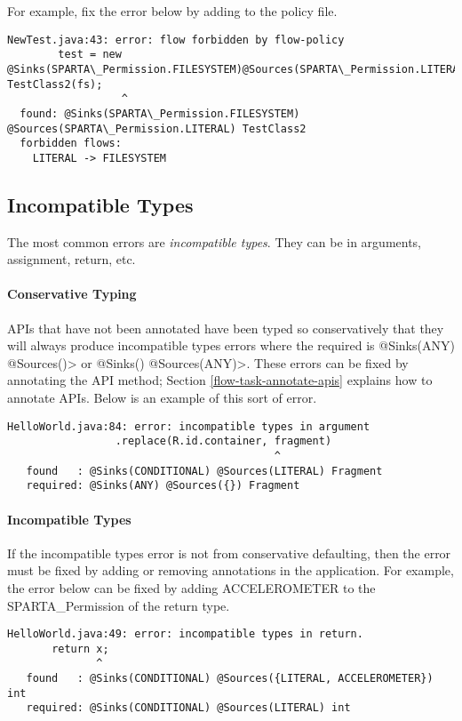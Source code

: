 For example, fix the error below by adding  to the policy file.
\begin{Verbatim}
NewTest.java:43: error: flow forbidden by flow-policy  
        test = new @Sinks(SPARTA\_Permission.FILESYSTEM)@Sources(SPARTA\_Permission.LITERAL) TestClass2(fs);
                  ^
  found: @Sinks(SPARTA\_Permission.FILESYSTEM) @Sources(SPARTA\_Permission.LITERAL) TestClass2 
  forbidden flows:
    LITERAL -> FILESYSTEM
\end{Verbatim}

\subsection{Incompatible Types}
The most common errors are \emph{incompatible types}.  They can be in arguments,  assignment, return, etc.

\paragraph{Conservative Typing}

APIs that have not been annotated have been typed so conservatively that they will always produce incompatible types errors where the required is \<@Sinks(ANY) @Sources({})> or 
\<@Sinks({}) @Sources(ANY)>.  These errors can be fixed by annotating the API method; 
Section \ref{flow-task-annotate-apis} explains how to annotate APIs. 
Below is an example of this sort of error.

\begin{Verbatim}
HelloWorld.java:84: error: incompatible types in argument
                 .replace(R.id.container, fragment)
                                          ^
   found   : @Sinks(CONDITIONAL) @Sources(LITERAL) Fragment
   required: @Sinks(ANY) @Sources({}) Fragment
\end{Verbatim}

\paragraph{Incompatible Types}

If the incompatible types error is not from conservative defaulting, then the error must be fixed by adding or
removing annotations in the application.  For example, the error below can be fixed by adding ACCELEROMETER to the SPARTA\_Permission of the return type.  

\begin{Verbatim}
HelloWorld.java:49: error: incompatible types in return.
       return x;
              ^
   found   : @Sinks(CONDITIONAL) @Sources({LITERAL, ACCELEROMETER}) int
   required: @Sinks(CONDITIONAL) @Sources(LITERAL) int
\end{Verbatim}

